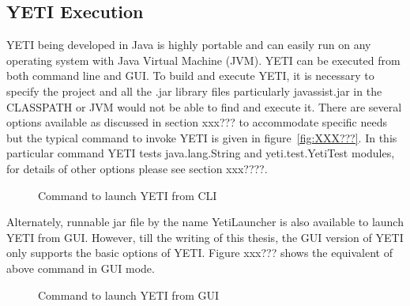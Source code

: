 \subsection{YETI Execution}
YETI being developed in Java is highly portable and can easily run on any operating system with Java Virtual Machine (JVM). YETI can be executed from both command line and GUI. To build and execute YETI, it is necessary to specify the project and all the .jar library files particularly javassist.jar in the CLASSPATH or JVM would not be able to find and execute it. There are several options available as discussed in section xxx??? to accommodate specific needs but the typical command to invoke YETI is given in figure~\ref{fig:XXX???}. In this particular command YETI tests java.lang.String and yeti.test.YetiTest modules, for details of other options please see section xxx????. 

\begin{figure}[h]
	\centering
	\caption{Command to launch YETI from CLI}
\end{figure}

Alternately, runnable jar file by the name YetiLauncher is also available to launch YETI from GUI. However, till the writing of this thesis, the GUI version of YETI only supports the basic options of YETI. Figure xxx??? shows the equivalent of above command in GUI mode.

\begin{figure}[h]
	\centering
	\caption{Command to launch YETI from GUI}
\end{figure}



